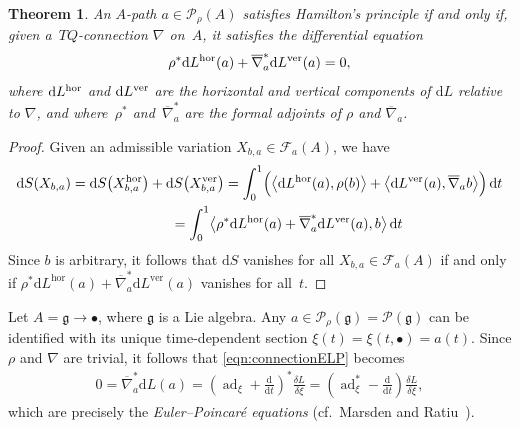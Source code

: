 \documentclass[10pt,a4paper]{amsart}
\numberwithin{equation}{section}
\newtheorem{Theorem}{Theorem}[section]
\begin{document}
\begin{Theorem} \label{thm:connectionELP}
An $A$-path $ a \in \mathcal{P} _\rho (A) $ satisfies Hamilton's principle if and only if, given a~$ T Q $-connection $ \nabla $ on~$A$, it satisfies the differential equation
 \begin{gather}\label{eqn:connectionELP}
 \rho ^\ast \mathrm{d} L ^\textup{hor} (a) + \overline{ \nabla }_a ^\ast \mathrm{d} L ^\textup{ver} (a) = 0 ,
 \end{gather}
 where $ \mathrm{d} L ^\textup{hor} $ and $ \mathrm{d} L ^\textup{ver} $ are the horizontal and vertical components of $ \mathrm{d} L $ relative to $ \nabla $, and where~$ \rho ^\ast $ and~$ \overline{ \nabla } _a ^\ast $ are the formal adjoints of $ \rho $ and $ \overline{ \nabla } _a $.
\end{Theorem}

\begin{proof} Given an admissible variation $ X _{ b, a } \in \mathcal{F} _a (A) $, we have
 \begin{gather*}
 \mathrm{d} S ( X _{ b, a } ) = \mathrm{d} S \big( X _{ b, a } ^\text{hor} \big) + \mathrm{d} S \big( X _{ b, a } ^\text{ver} \big)
= \int _0 ^1 \Bigl( \bigl\langle \mathrm{d} L ^\text{hor} (a) , \rho (b) \bigr\rangle + \bigl\langle \mathrm{d} L ^\text{ver} (a)
 , \overline{ \nabla } _a b \bigr\rangle \Bigr) \,\mathrm{d}t \\
\hphantom{\mathrm{d} S ( X _{ b, a } )}{} = \int _0 ^1 \bigl\langle \rho ^\ast \mathrm{d} L ^\text{hor} (a)
 + \overline{ \nabla } _a ^\ast \mathrm{d} L ^\text{ver} (a) , b \bigr\rangle \,\mathrm{d}t
 \end{gather*}
 Since $b$ is arbitrary, it follows that $ \mathrm{d} S $ vanishes for all $ X _{ b, a } \in \mathcal{F} _a (A) $ if and only if $ \rho ^\ast \mathrm{d} L ^\text{hor} (a) + \overline{ \nabla } _a ^\ast \mathrm{d} L ^\text{ver} (a) $ vanishes for all~$t$.
\end{proof}

\begin{Example} \label{ex:algebraELP}
Let $ A = \mathfrak{g} \rightarrow \bullet $, where $ \mathfrak{g} $ is a Lie algebra. Any $ a \in \mathcal{P} _\rho (\mathfrak{g} ) = \mathcal{P} (\mathfrak{g} ) $ can be identif\/ied with its unique time-dependent section $ \xi (t) = \xi ( t, \bullet ) = a (t) $. Since $ \rho $ and $ \nabla $ are trivial, it follows that \eqref{eqn:connectionELP} becomes
 \begin{gather*}
 0 = \overline{ \nabla } _a ^\ast \mathrm{d} L (a) = \left( \operatorname{ad} _\xi + \frac{\mathrm{d}}{\mathrm{d}t}
 \right) ^\ast \frac{ \delta L }{ \delta \xi } = \left( \operatorname{ad} _\xi ^\ast - \frac{\mathrm{d}}{\mathrm{d}t} \right) \frac{ \delta L }{ \delta \xi },
 \end{gather*}
 which are precisely the \emph{Euler--Poincar\'e equations} (cf.\ Marsden and Ratiu~\cite[Chapter~13]{MaRa1999}).
\end{Example}
\end{document}
